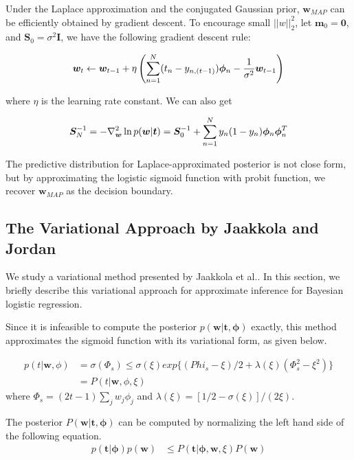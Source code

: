 Under the Laplace approximation and the conjugated Gaussian prior, $\bm{w}_{MAP}$
can be efficiently obtained by gradient descent. To encourage small
$||w||^2_2$, let $\bm{m}_0 = \bm{0}$, and $\bm{S}_0 = \sigma^2 \bm{I}$, we
have the following gradient descent rule: 

\begin{equation}
\bm{w}_t \leftarrow \bm{w}_{t-1} + \eta\left( \sum_{n=1}^N (t_n - y_{n,(t-1)}) \bm{\phi}_n -
\frac{1}{\sigma^2}\bm{w}_{t-1} \right)
\end{equation}

where $\eta$ is the learning rate constant. We can also get

\begin{equation}
\bm{S}_N^{-1} = -\nabla^2_{\bm{w}} \ln p(\bm{w}|\bm{t})
= \bm{S}_0^{-1} + \sum_{n=1}^N y_n(1-y_n) \bm{\phi}_n \bm{\phi}_n^T
\end{equation}

The predictive distribution for Laplace-approximated posterior is not close
form, but by approximating the logistic sigmoid function with probit function,
we recover $\bm{w}_{MAP}$ as the decision boundary.

\subsection{The Variational Approach by Jaakkola and Jordan}
We study a variational method presented by Jaakkola et al.\cite{Jaakkola96avariational}. In this section, we briefly describe this variational approach for approximate inference for Bayesian logistic regression. 

Since it is infeasible to compute the posterior $p(\bm{w} | \bm{t}, \bm{\phi})$ exactly, this method approximates the sigmoid function with its variational form, as given below.

\begin{align}
  p(t | \bm{w}, \phi) &= \sigma(\Phi_s) \leq \sigma(\xi) exp\{(Phi_s - \xi)/2 + \lambda(\xi)(\Phi_s^2 - \xi^2)\} \\
  &= P(t | \bm{w}, \phi, \xi)
\end{align}
where $\Phi_s = (2t - 1)\sum_jw_j\phi_j$ and $\lambda(\xi) = [1/2 - \sigma(\xi)]/(2\xi)$.

The posterior $P(\bm{w}|\bm{t}, \bm{\phi})$ can be computed by normalizing the left hand side of the following equation.
\begin{align}
\label{eq:variational}
p(\bm{t}|\bm{\phi})p(\bm{w}) &\leq P(\bm{t}|\bm{\phi}, \bm{w}, \xi)P(\bm{w})
\end{align}

